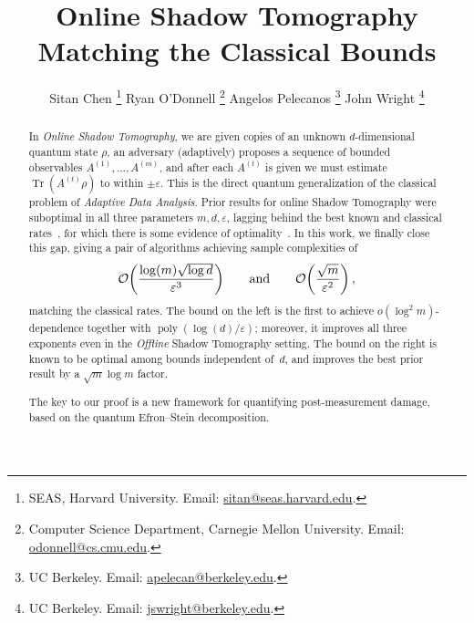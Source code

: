\documentclass[10pt]{article}
\title{Online Shadow Tomography Matching the Classical Bounds}
\author{
Sitan Chen
\thanks{SEAS, Harvard University. Email: \href{mailto:sitan@seas.harvard.edu}{sitan@seas.harvard.edu}.} \qquad
Ryan O'Donnell
\thanks{Computer Science Department, Carnegie Mellon University. Email: \href{mailto:odonnell@cs.cmu.edu}{odonnell@cs.cmu.edu}.} \qquad
Angelos Pelecanos
\thanks{UC Berkeley. Email: \href{mailto:apelecan@berkeley.edu}{apelecan@berkeley.edu}.} \qquad
John Wright
\thanks{UC Berkeley. Email: \href{mailto:jswright@berkeley.edu}{jswright@berkeley.edu}.}
}
\DeclarePairedDelimiter\parens{\lparen}{\rparen}
\newcommand{\eps}{\epsilon}
\newcommand{\wt}[1]{\widetilde{#1}}
\renewcommand{\epsilon}{\varepsilon}
\DeclareMathOperator{\Tr}{Tr}
\DeclareMathOperator{\poly}{poly}
\begin{document}
\maketitle
\begin{abstract}
    In \emph{Online Shadow Tomography}, we are given copies of an unknown $d$-dimensional quantum state $\rho$, an adversary (adaptively) proposes a sequence of bounded observables $A^{(1)},\ldots,A^{(m)}$, and after each $A^{(t)}$ is given we must estimate $\Tr(A^{(t)}\rho)$ to within $\pm \epsilon$. 
    This is the direct quantum generalization of the classical problem of \emph{Adaptive Data Analysis}. %
    Prior results for online Shadow Tomography were suboptimal in all three parameters $m, d, \epsilon$, lagging behind the best known and classical rates~\cite{bassily2021algorithmic}, for which there is some evidence of optimality~\cite{NSSSU18,lyu2025fingerprinting}. In this work, we finally close this gap, giving a pair of algorithms achieving  sample complexities of
    \begin{equation}
        \mathcal{O}\parens*{\frac{\log(m) \sqrt{\log d}}{\epsilon^3}}\qquad \text{and} \qquad \mathcal{O}\parens*{\frac{\sqrt{m}}{\epsilon^2}}\,,
    \end{equation}
    matching the classical rates. 
    The bound on the left is the first to achieve $o(\log^2 m)$-dependence together with $\poly(\log(d)/\eps)$; moreover, it improves all three exponents even in the \emph{Offline} Shadow Tomography setting.  The bound on the right is known to be optimal among bounds independent of~$d$, and improves the best prior result by a $\sqrt{m} \log m$ factor.
    
    The key to our proof is a new framework for quantifying post-measurement damage, based on the quantum Efron--Stein decomposition.%
\end{abstract}
\end{document}
